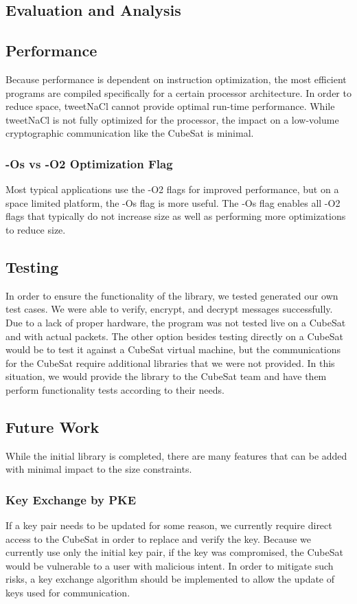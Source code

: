 \documentclass[12pt]{article}
\begin{document}
\begin{multicols}{2}
\section{Evaluation and Analysis}
\subsection{Performance}
Because performance is dependent on instruction optimization, the most efficient programs are compiled specifically for a certain processor architecture. In order to reduce space, tweetNaCl cannot provide optimal run-time performance. \cite{TweetNaCl} While tweetNaCl is not fully optimized for the processor, the impact on a low-volume cryptographic communication like the CubeSat is minimal.
\subsubsection{-Os vs -O2 Optimization Flag}
Most typical applications use the -O2 flags for improved performance, but on a space limited platform, the -Os flag is more useful. The -Os flag enables all -O2 flags that typically do not increase size as well as performing more optimizations to reduce size. \cite{GCC} 
\subsection{Testing}
In order to ensure the functionality of the library, we tested generated our own test cases. We were able to verify, encrypt, and decrypt messages successfully. Due to a lack of proper hardware, the program was not tested live on a CubeSat and with actual packets. The other option besides testing directly on a CubeSat would be to test it against a CubeSat virtual machine, but the communications for the CubeSat require additional libraries that we were not provided. In this situation, we would provide the library to the CubeSat team and have them perform functionality tests according to their needs.
\subsection{Future Work}
While the initial library is completed, there are many features that can be added with minimal impact to the size constraints.
\subsubsection{Key Exchange by PKE}
If a key pair needs to be updated for some reason, we currently require direct access to the CubeSat in order to replace and verify the key. Because we currently use only the initial key pair, if the key was compromised, the CubeSat would be vulnerable to a user with malicious intent. In order to mitigate such risks, a key exchange algorithm should be implemented to allow the update of keys used for communication.

\end{multicols}
\end{document}
